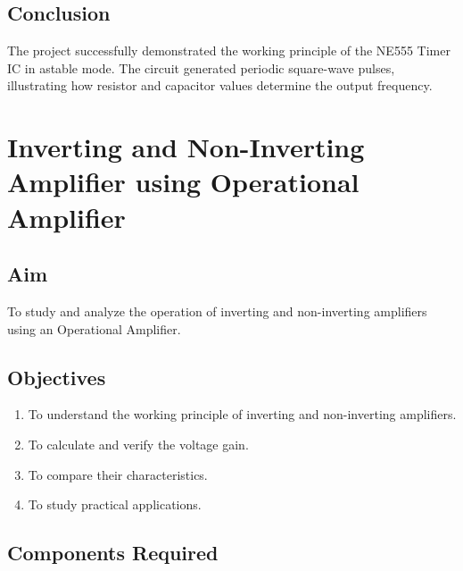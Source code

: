 \documentclass[12pt,a4paper]{report}
\begin{document}
\section{Conclusion}

The project successfully demonstrated the working principle of the NE555 Timer IC in astable mode. The circuit generated periodic square-wave pulses, illustrating how resistor and capacitor values determine the output frequency.

\newpage


\chapter{Inverting and Non-Inverting Amplifier using Operational Amplifier}

\section{Aim}

To study and analyze the operation of inverting and non-inverting amplifiers using an Operational Amplifier.

\section{Objectives}

\begin{enumerate}

\item To understand the working principle of inverting and non-inverting amplifiers.

\item To calculate and verify the voltage gain.

\item To compare their characteristics.

\item To study practical applications.

\end{enumerate}

\section{Components Required}
\end{document}
